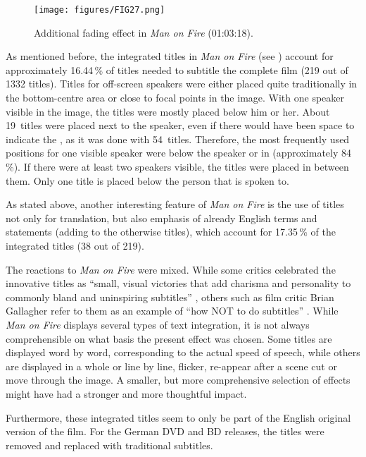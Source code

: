 \begin{figure}
\texttt{[image: figures/FIG27.png]}
\caption{Additional fading effect in \textit{Man on Fire} (01:03:18).}
\label{fig:FIG27}
\end{figure}


As mentioned before, the integrated titles in \textit{Man on Fire} (see ) account for approximately 16.44\,\% of titles needed to subtitle the complete film (219 out of 1332 titles). Titles for off-screen speakers were either placed quite traditionally in the bottom-centre area or close to focal points in the image. With one speaker visible in the image, the titles were mostly placed below him or her. About 19~titles were placed next to the speaker, even if there would have been space to indicate the , as it was done with 54~titles. Therefore, the most frequently used positions for one visible speaker were below the speaker or in  (approximately 84\,\%). If there were at least two speakers visible, the titles were placed in between them. Only one title is placed below the person that is spoken to.


As stated above, another interesting feature of \textit{Man on Fire} is the use of titles not only for translation, but also emphasis of already English terms and statements (adding  to the otherwise  titles), which account for 17.35\,\% of the integrated titles (38 out of 219).

The reactions to \textit{Man on Fire} were mixed. While some critics celebrated the innovative titles as “small, visual victories that add charisma and personality to commonly bland and uninspiring subtitles” \citep{Vit2005}, others such as film critic Brian Gallagher refer to them as an example of “how NOT to do subtitles” \citep{Gallagher2004}. While \textit{Man on Fire} displays several  types of text integration, it is not always comprehensible on what basis the present effect was chosen. Some titles are displayed word by word, corresponding to the actual speed of speech, while others are displayed in a whole or line by line, flicker, re-appear after a scene cut or move through the image. A smaller, but more comprehensive selection of effects might have had a stronger and more thoughtful impact.

Furthermore, these integrated titles seem to only be part of the English original version of the film. For the German DVD and BD releases, the titles were removed and replaced with traditional subtitles.

